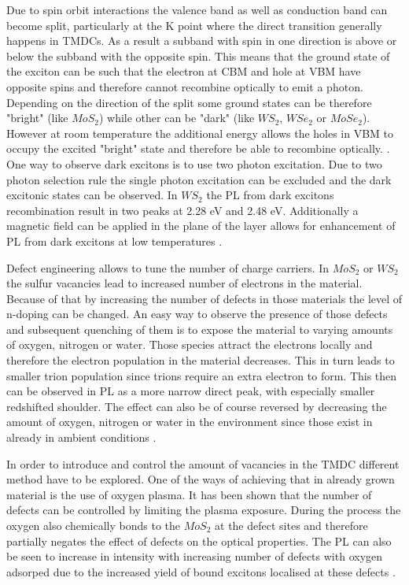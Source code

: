 Due to spin orbit interactions the valence band as well as conduction band can become split, particularly at the K point where the direct transition generally happens in TMDCs. As a result a subband with spin in one direction is above or below the subband with the opposite spin. This means that the ground state of the exciton can be such that the electron at CBM and hole at VBM have opposite spins and therefore cannot recombine optically to emit a photon. Depending on the direction of the split some ground states can be therefore "bright" (like $MoS_2$) while other can be "dark" (like $WS_2$, $WSe_2$ or $MoSe_2$). However at room temperature the additional energy allows the holes in VBM to occupy the excited "bright" state and therefore be able to recombine optically. \cite{Molas2017}. One way to observe dark excitons is to use two photon excitation. Due to two photon selection rule the single photon excitation can be excluded and the dark excitonic states can be observed. In $WS_2$ the PL from dark excitons recombination result in two peaks at 2.28 eV and 2.48 eV. \cite{Ye2014} Additionally a magnetic field can be applied in the plane of the layer allows for enhancement of PL from dark excitons at low temperatures \cite{Molas2017}.
	
Defect engineering allows to tune the number of charge carriers. In $MoS_2$ or $WS_2$ the sulfur vacancies lead to increased number of electrons in the material. Because of that by increasing the number of defects in those materials the level of n-doping can be changed. An easy way to observe the presence of those defects and subsequent quenching of them is to expose the material to varying amounts of oxygen, nitrogen or water. Those species attract the electrons locally and therefore the electron population in the material decreases. This in turn leads to smaller trion population since trions require an extra electron to form. This then can be observed in PL as a more narrow direct peak, with especially smaller redshifted shoulder. The effect can also be of course reversed by decreasing the amount of oxygen, nitrogen or water in the environment since those exist in already in ambient conditions \cite{Currie2015}.
	
In order to introduce and control the amount of vacancies in the TMDC different method have to be explored. One of the ways of achieving that in already grown material is the use of oxygen plasma. It has been shown that the number of defects can be controlled by limiting the plasma exposure. During the process the oxygen also chemically bonds to the $MoS_2$ at the defect sites and therefore partially negates the effect of defects on the optical properties. The PL can also be seen to increase in intensity with increasing number of defects with oxygen adsorped due to the increased yield of bound excitons localised at these defects \cite{Nan2014}.
	
